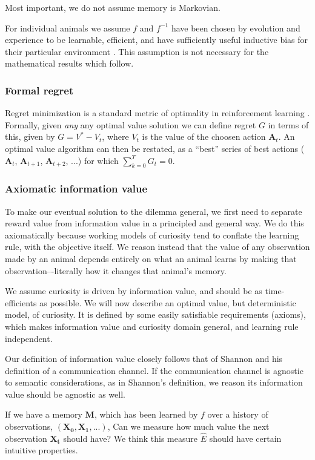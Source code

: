 Most important, we do not assume memory is Markovian.

For individual animals we assume $f$ and $f^{-1}$ have been chosen by evolution and experience to be learnable, efficient, and have sufficiently useful inductive bias for their particular environment \cite{Valiant1984,Thrun1992a}. This assumption is not necessary for the mathematical results which follow.

\subsubsection*{Formal regret}
Regret minimization is a standard metric of optimality in reinforcement learning \citep{Sutton2018}. Formally, given \emph{any} any optimal value solution we can define regret $G$ in terms of this, given by $G = V^* - V_t$, where $V_t$ is the value of the choosen action $\mathbf{A}_t$. An optimal value algorithm can then be restated, as a ``best'' series of best actions ($\mathbf{A}_t$, $\mathbf{A}_{t+1}$, $\mathbf{A}_{t+2}$, ...) for which $\sum_{k=0}^{T} G_t = 0$.

\subsubsection*{Axiomatic information value} 
To make our eventual solution to the dilemma general, we first need to separate reward value from information value in a principled and general way. We do this axiomatically because working models of curiosity tend to conflate the learning rule, with the objective itself. We reason instead that the value of any observation made by an animal depends entirely on what an animal learns by making that observation–-literally how it changes that animal's memory. 

We assume curiosity is driven by information value, and should be as time-efficients as possible. We will now describe an optimal value, but deterministic model, of curiosity. It is defined by some easily satisfiable requirements (axioms), which makes information value and curiosity domain general, and learning rule independent. 

Our definition of information value closely follows that of Shannon and his definition of a communication channel. If the communication channel is agnostic to semantic considerations, as in Shannon's definition, we reason its information value should be agnostic as well.

If we have a memory $\mathbf{M}$, which has been learned by $f$ over a history of observations, $(\mathbf{X_0},\mathbf{X_1},...)$, Can we measure how much value the next observation $\mathbf{X_t}$ should have? We think this measure $\hat E$ should have certain intuitive properties.

